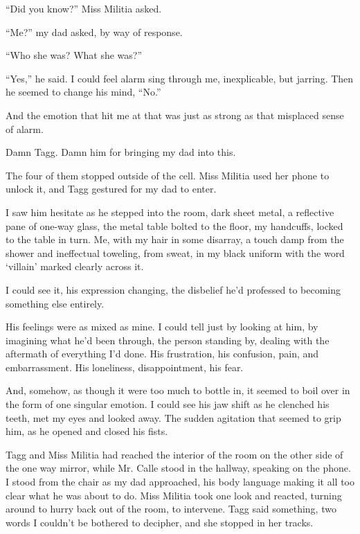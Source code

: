 ``Did you know?'' Miss Militia asked.



``Me?'' my dad asked, by way of response.



``Who she was?  What she was?''



``Yes,'' he said.  I could feel alarm sing through me, inexplicable, but jarring.  Then he seemed to change his mind, ``No.''



And the emotion that hit me at that was just as strong as that misplaced sense of alarm.



Damn Tagg.  Damn him for bringing my dad into this.



The four of them stopped outside of the cell.  Miss Militia used her phone to unlock it, and Tagg gestured for my dad to enter.



I saw him hesitate as he stepped into the room, dark sheet metal, a reflective pane of one-way glass, the metal table bolted to the floor, my handcuffs, locked to the table in turn.  Me, with my hair in some disarray, a touch damp from the shower and ineffectual toweling, from sweat, in my black uniform with the word `villain' marked clearly across it.



I could see it, his expression changing, the disbelief he'd professed to becoming something else entirely.



His feelings were as mixed as mine.  I could tell just by looking at him, by imagining what he'd been through, the person standing by, dealing with the aftermath of everything I'd done.  His frustration, his confusion, pain, and embarrassment.  His loneliness, disappointment, his fear.



And, somehow, as though it were too much to bottle in, it seemed to boil over in the form of one singular emotion.  I could see his jaw shift as he clenched his teeth, met my eyes and looked away.  The sudden agitation that seemed to grip him, as he opened and closed his fists.



Tagg and Miss Militia had reached the interior of the room on the other side of the one way mirror, while Mr. Calle stood in the hallway, speaking on the phone.  I stood from the chair as my dad approached, his body language making it all too clear what he was about to do.  Miss Militia took one look and reacted, turning around to hurry back out of the room, to intervene.  Tagg said something, two words I couldn't be bothered to decipher, and she stopped in her tracks.



